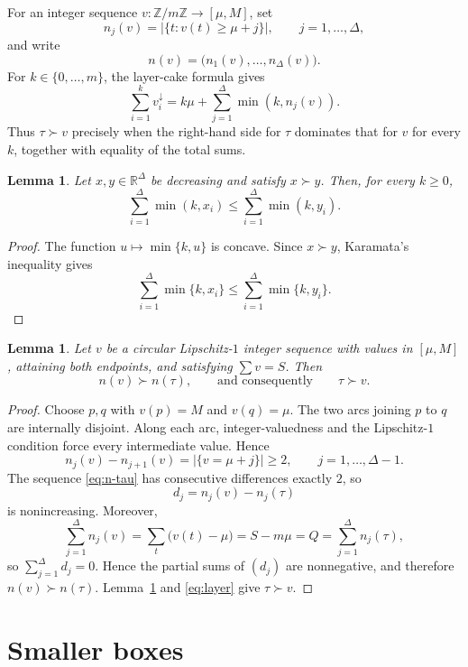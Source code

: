 \documentclass[11pt]{article}
\newtheorem{lemma}[theorem]{Lemma}
\theoremstyle{definition}
\newcommand{\Z}{\mathbb{Z}}
\newcommand{\R}{\mathbb{R}}
\begin{document}
For an integer sequence $v:\Z/m\Z\to[\mu,M]$, set
\[
n_j(v)=|\{t:v(t)\ge\mu+j\}|,
\qquad j=1,\dots,\Delta,
\]
and write
\[
n(v)=\bigl(n_1(v),\dots,n_\Delta(v)\bigr).
\]
For $k\in\{0,\dots,m\}$, the layer-cake formula gives
\begin{equation}\label{eq:layer}
\sum_{i=1}^kv_i^\downarrow
=k\mu+\sum_{j=1}^\Delta\min(k,n_j(v)).
\end{equation}
Thus $\tau\succ v$ precisely when the right-hand side for $\tau$ dominates that for $v$ for every $k$, together with equality of the total sums.

\begin{lemma}\label{lem:clip}
Let $x,y\in\R^\Delta$ be decreasing and satisfy $x\succ y$. Then, for every $k\ge0$,
\[
\sum_{i=1}^\Delta\min(k,x_i)
\le
\sum_{i=1}^\Delta\min(k,y_i).
\]
\end{lemma}

\begin{proof}
The function $u\mapsto\min\{k,u\}$ is concave. Since $x\succ y$, Karamata's inequality gives
\[
\sum_{i=1}^\Delta\min\{k,x_i\}
\le
\sum_{i=1}^\Delta\min\{k,y_i\}.
\]
\end{proof}

\begin{lemma}\label{lem:full-amp}
Let $v$ be a circular Lipschitz-$1$ integer sequence with values in $[\mu,M]$, attaining both endpoints, and satisfying $\sum v=S$. Then
\[
n(v)\succ n(\tau),
\qquad\text{and consequently}\qquad
\tau\succ v.
\]
\end{lemma}

\begin{proof}
Choose $p,q$ with $v(p)=M$ and $v(q)=\mu$. The two arcs joining $p$ to $q$ are internally disjoint. Along each arc, integer-valuedness and the Lipschitz-$1$ condition force every intermediate value. Hence
\[
n_j(v)-n_{j+1}(v)=|\{v=\mu+j\}|\ge2,
\qquad j=1,\dots,\Delta-1.
\]
The sequence \eqref{eq:n-tau} has consecutive differences exactly $2$, so
\[
d_j=n_j(v)-n_j(\tau)
\]
is nonincreasing. Moreover,
\[
\sum_{j=1}^\Delta n_j(v)
=\sum_t\bigl(v(t)-\mu\bigr)
=S-m\mu
=Q
=\sum_{j=1}^\Delta n_j(\tau),
\]
so $\sum_{j=1}^\Delta d_j=0$. Hence the partial sums of $(d_j)$ are nonnegative, and therefore $n(v)\succ n(\tau)$. Lemma~\ref{lem:clip} and \eqref{eq:layer} give $\tau\succ v$.
\end{proof}

\section{Smaller boxes}
\end{document}

